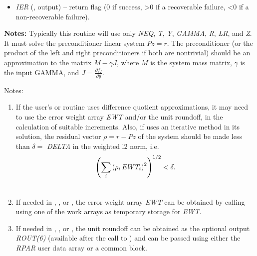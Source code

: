 \documentclass[letterpaper,10pt,english]{sphinxmanual}
\begin{document}
\begin{fulllineitems}
\begin{description}
\begin{itemize}
\item {} 
\emph{IER}  (, output) -- return flag  (0 if success, \textgreater{}0 if a recoverable
failure, \textless{}0 if a non-recoverable failure).

\end{itemize}

\end{description}

\textbf{Notes:}
Typically this routine will use only \emph{NEQ}, \emph{T}, \emph{Y}, \emph{GAMMA}, \emph{R},
\emph{LR}, and \emph{Z}.  It must solve the preconditioner linear system
$Pz = r$.  The preconditioner (or the product of the left and
right preconditioners if both are nontrivial) should be an
approximation to the matrix  $M - \gamma J$, where
$M$ is the system mass matrix, $\gamma$ is the input
GAMMA, and $J = \frac{\partial f_I}{\partial y}$.

\end{fulllineitems}


Notes:
\begin{enumerate}
\item {} 
If the user's {\hyperref[f_interface/Usage:f/_/FARKJTIMES]{}} or {\hyperref[f_interface/Usage:f/_/FARKPSET]{}} routine
uses difference quotient approximations, it may need to use the
error weight array \emph{EWT} and/or the unit roundoff, in the
calculation of suitable increments. Also, if {\hyperref[f_interface/Usage:f/_/FARKPSOL]{}}
uses an iterative method in its solution, the residual vector
$\rho = r - Pz$ of the system should be made less than
$\delta =$ \emph{DELTA} in the weighted l2 norm, i.e.
\begin{gather}
\begin{split}\left(\sum_i \left(\rho_i\, EWT_i\right)^2 \right)^{1/2} < \delta.\end{split}\notag\\\begin{split}\end{split}\notag
\end{gather}
\item {} 
If needed in {\hyperref[f_interface/Usage:f/_/FARKJTIMES]{}}, {\hyperref[f_interface/Usage:f/_/FARKPSOL]{}}, or
{\hyperref[f_interface/Usage:f/_/FARKPSET]{}}, the error weight array \emph{EWT} can be
obtained by calling {\hyperref[f_interface/Optional_output:f/_/FARKGETERRWEIGHTS]{}} using one of the
work arrays as temporary storage for \emph{EWT}.

\item {} 
If needed in {\hyperref[f_interface/Usage:f/_/FARKJTIMES]{}}, {\hyperref[f_interface/Usage:f/_/FARKPSOL]{}}, or
{\hyperref[f_interface/Usage:f/_/FARKPSET]{}}, the unit roundoff can be obtained as the
optional output \emph{ROUT(6)} (available after the call to
{\hyperref[f_interface/Usage:f/_/FARKMALLOC]{}}) and can be passed using either the \emph{RPAR}
user data array or a common block.

\end{enumerate}
\end{document}
